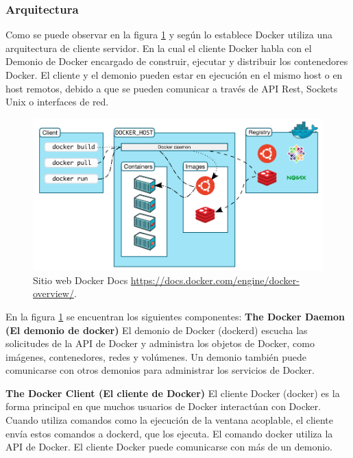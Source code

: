 \subsubsection{Arquitectura}

Como se puede observar en la figura \ref{fig:DockerArquitectura} y según lo establece \textcite{Docker2018} Docker utiliza una arquitectura de cliente servidor. En la cual el cliente Docker habla con el Demonio de Docker encargado de construir, ejecutar y distribuir los contenedores Docker. El cliente y el demonio pueden estar en ejecución en el mismo host o en host remotos, debido a que se pueden comunicar a través de API Rest, Sockets Unix o interfaces de red.

\begin{figure}[!hbtp]
	\centering
	\includegraphics[width=\linewidth]{RE05_Docker/REDocker_Arquitectura.png}
	\vspace{-0.2cm}
	\caption{Sitio web Docker Docs \url{https://docs.docker.com/engine/docker-overview/}.}
	\label{fig:DockerArquitectura}
\end{figure}

En la figura \ref{fig:DockerArquitectura} se encuentran los siguientes componentes:
\textbf{The Docker Daemon (El demonio de docker)}
El demonio de Docker (dockerd) escucha las solicitudes de la API de Docker y administra los objetos de Docker, como imágenes, contenedores, redes y volúmenes. Un demonio también puede comunicarse con otros demonios para administrar los servicios de Docker. \parencite{Docker2018}

\textbf{The Docker Client (El cliente de Docker)}
El cliente Docker (docker) es la forma principal en que muchos usuarios de Docker interactúan con Docker. Cuando utiliza comandos como la ejecución de la ventana acoplable, el cliente envía estos comandos a dockerd, que los ejecuta. El comando docker utiliza la API de Docker. El cliente Docker puede comunicarse con más de un demonio.\parencite{Docker2018}

